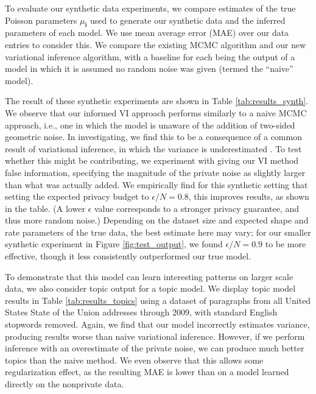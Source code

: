 \documentclass[letterpaper]{article}
\newcommand{\subs}{\pmb{i}}
\newcommand{\mus}{\mu_{\subs}}
\begin{document}
  To evaluate our synthetic data experiments, we compare estimates of the true
  Poisson parameters $\mus$ used to generate our synthetic data and the inferred
  parameters of each model. We use mean average error (MAE) over our data entries
  to consider this. We compare the existing MCMC algorithm and our new variational
  inference algorithm, with a baseline for each being the output of a model in which
  it is assumed no random noise was given (termed the ``naive'' model).
  
  The result of these synthetic experiments are shown in Table \ref{tab:results_synth}. We observe that our informed VI approach performs similarly to a naive MCMC approach, i.e., one in which the model is unaware of the addition of two-sided geometric noise. In investigating, we find this to be a consequence of a common result of variational inference, in which the variance is underestimated \cite{blei2017variational}. To test whether this might be contributing, we experiment with giving our VI method false information, specifying the magnitude of the private noise as slightly larger than what was actually added. We empirically find for this synthetic setting that setting the expected privacy budget to $\epsilon / N = 0.8$, this improves results, as shown in the table. (A lower $\epsilon$ value corresponds to a stronger privacy guarantee, and thus more random noise.) Depending on the dataset size and expected shape and rate parameters of the true data, the best estimate here may vary; for our smaller synthetic experiment in Figure \ref{fig:test_output}, we found $\epsilon / N = 0.9$ to be more effective, though it less consistently outperformed our true model.

  To demonstrate that this model can learn interesting patterns on larger scale data, we also consider topic output for a topic model. We display topic model results in Table \ref{tab:results_topics} using a dataset of paragraphs from all United States State of the Union addresses through 2009, with standard English stopwords removed. Again, we find that our model incorrectly estimates variance, producing results worse than naive variational inference. However, if we perform inference with an overestimate of the private noise, we can produce much better topics than the naive method. We even observe that this allows some regularization effect, as the resulting MAE is lower than on a model learned directly on the nonprivate data.
\end{document}
